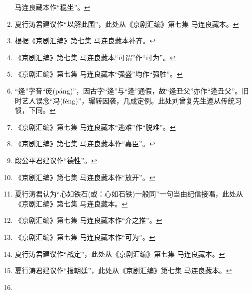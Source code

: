 \begin{enumerate}
  马连良藏本作``稳坐''。\protect\hyperlink{fnref98}{↩}
\item
  \leavevmode\hypertarget{fn99}{}%
  夏行涛君建议作``以解此围''，此处从《京剧汇编》第七集
  马连良藏本。\protect\hyperlink{fnref99}{↩}
\item
  \leavevmode\hypertarget{fn100}{}%
  根据《京剧汇编》第七集 马连良藏本补齐。\protect\hyperlink{fnref100}{↩}
\item
  \leavevmode\hypertarget{fn101}{}%
  《京剧汇编》第七集
  马连良藏本``可谓''作``可为''。\protect\hyperlink{fnref101}{↩}
\item
  \leavevmode\hypertarget{fn102}{}%
  《京剧汇编》第七集
  马连良藏本``强盛''均作``强胜''。\protect\hyperlink{fnref102}{↩}
\item
  \leavevmode\hypertarget{fn103}{}%
  ``逄''字音``庞(páng)''，因古字``逄''与``逢''通假，故``逄丑父''亦作``逢丑父''。旧时艺人误念``冯(féng)''，辗转因袭，几成定例。此处刘曾复先生遵从传统习惯，下同。\protect\hyperlink{fnref103}{↩}
\item
  \leavevmode\hypertarget{fn104}{}%
  《京剧汇编》第七集
  马连良藏本``逃难''作``脱难''。\protect\hyperlink{fnref104}{↩}
\item
  \leavevmode\hypertarget{fn105}{}%
  《京剧汇编》第七集
  马连良藏本作``嘉臣''。\protect\hyperlink{fnref105}{↩}
\item
  \leavevmode\hypertarget{fn106}{}%
  段公平君建议作``德性''。\protect\hyperlink{fnref106}{↩}
\item
  \leavevmode\hypertarget{fn107}{}%
  《京剧汇编》第七集
  马连良藏本作``放开''。\protect\hyperlink{fnref107}{↩}
\item
  \leavevmode\hypertarget{fn108}{}%
  夏行涛君认为``心如铁石(或：心如石铁)一般同''一句当由纪信接唱，此处从《京剧汇编》第七集
  马连良藏本。\protect\hyperlink{fnref108}{↩}
\item
  \leavevmode\hypertarget{fn109}{}%
  《京剧汇编》第七集
  马连良藏本作``介之推''。\protect\hyperlink{fnref109}{↩}
\item
  \leavevmode\hypertarget{fn110}{}%
  《京剧汇编》第七集
  马连良藏本作``可为''。\protect\hyperlink{fnref110}{↩}
\item
  \leavevmode\hypertarget{fn111}{}%
  夏行涛君建议作``战定''，此处从《京剧汇编》第七集
  马连良藏本。\protect\hyperlink{fnref111}{↩}
\item
  \leavevmode\hypertarget{fn112}{}%
  夏行涛君建议作``报朝廷''，此处从《京剧汇编》第七集
  马连良藏本。\protect\hyperlink{fnref112}{↩}
\item
  \leavevmode\hypertarget{fn113}{}%

\end{enumerate}
